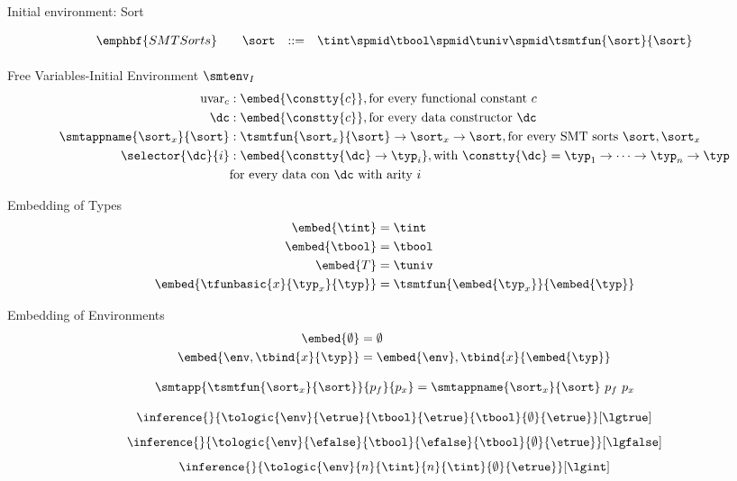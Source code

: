


Initial environment: Sort

$$
\begin{array}{rrcl}
\emphbf{SMT Sorts} \quad 
  & \sort
  & ::=   & \tint \spmid \tbool \spmid \tuniv \spmid \tsmtfun{\sort}{\sort}
\\[0.05in]
\end{array}
$$

Free Variables-Initial Environment $\smtenv_I$
\begin{align*}
\text{uvar}_c&:\embed{\constty{c}}, \text{for every functional constant}\ c \\
\dc&:\embed{\constty{c}}, \text{for every data constructor}\ \dc\\
\smtappname{\sort_x}{\sort}&: \tsmtfun{\sort_x}{\sort} \rightarrow \sort_x \rightarrow \sort , 
\text{for every SMT sorts}\ \sort, \sort_x\\
\selector{\dc}{i} &: \embed{\constty{\dc} \rightarrow \typ_i}, 
\text{with}\ \constty{\dc} = \typ_1 \rightarrow \dots \rightarrow \typ_n\rightarrow\typ\\
& \text{for every data con}\ \dc\ \text{with arity}\ i
\end{align*}




Embedding of Types
\begin{align*}
\embed{\tint} &=\tint\\
\embed{\tbool} &=\tbool\\
\embed{T}     &= \tuniv\\
\embed{\tfunbasic{x}{\typ_x}{\typ}} &= \tsmtfun{\embed{\typ_x}}{\embed{\typ}}
\end{align*}


Embedding of Environments
\begin{align*}
\embed{\emptyset} &= \emptyset \\
\embed{\env, \tbind{x}{\typ}} &= \embed{\env}, \tbind{x}{\embed{\typ}}
\end{align*}




\begin{align*}
\smtapp{\tsmtfun{\sort_x}{\sort}}{p_f}{p_x} 
   = \smtappname{\sort_x}{\sort}\ {p_f}\ p_x
\end{align*}




\hfill{}
$$
\inference{
}{
	\tologic{\env}{\etrue}{\tbool}{\etrue}{\tbool}{\emptyset}{\etrue}
}[\lgtrue]
$$
$$
\inference{
}{
	\tologic{\env}{\efalse}{\tbool}{\efalse}{\tbool}{\emptyset}{\etrue}
}[\lgfalse]
$$
$$
\inference{
}{
	\tologic{\env}{n}{\tint}{n}{\tint}{\emptyset}{\etrue}
}[\lgint]
$$

